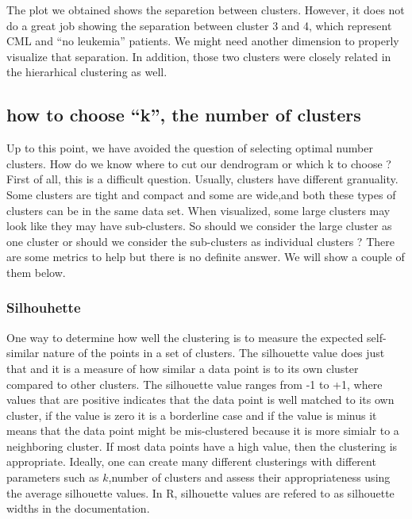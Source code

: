 \documentclass[12pt,]{krantz}
\begin{document}
The plot we obtained shows the separetion between clusters. However, it does not do a great job showing the separation between cluster 3 and 4, which represent CML and ``no leukemia'' patients. We might need another dimension to properly visualize that separation. In addition, those two clusters were closely related in the hierarhical clustering as well.

\hypertarget{how-to-choose-k-the-number-of-clusters}{%
\subsection{how to choose ``k'', the number of clusters}\label{how-to-choose-k-the-number-of-clusters}}

Up to this point, we have avoided the question of selecting optimal number clusters. How do we know where to cut our dendrogram or which k to choose ?
First of all, this is a difficult question. Usually, clusters have different granuality. Some clusters are tight and compact and some are wide,and both these types of clusters can be in the same data set. When visualized, some large clusters may look like they may have sub-clusters. So should we consider the large cluster as one cluster or should we consider the sub-clusters as individual clusters ? There are some metrics to help but there is no definite answer. We will show a couple of them below.

\hypertarget{silhouhette}{%
\subsubsection{Silhouhette}\label{silhouhette}}

One way to determine how well the clustering is to measure the expected self-similar nature of the points in a set of clusters. The silhouette value does just that and it is a measure of how similar a data point is to its own cluster compared to other clusters. The silhouette value ranges from -1 to +1, where values that are positive indicates that the data point is well matched to its own cluster, if the value is zero it is a borderline case and if the value is minus it means that the data point might be mis-clustered because it is more simialr to a neighboring cluster. If most data points have a high value, then the clustering is appropriate. Ideally, one can create many different clusterings with different parameters such as \(k\),number of clusters and assess their appropriateness using the average
silhouette values. In R, silhouette values are refered to as silhouette widths in the documentation.
\end{document}
